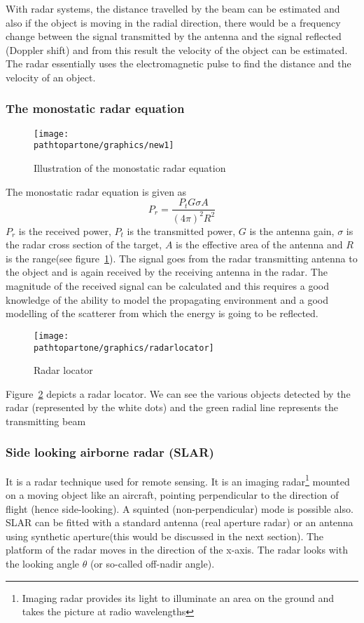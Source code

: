 With radar systems, the distance travelled by the beam can be estimated and also if the object is moving in the radial direction, there would be a frequency change between the signal transmitted by the antenna and the signal reflected (Doppler shift) and from this result the velocity of the object can be estimated. The radar essentially uses the electromagnetic pulse to find the distance and the velocity of an object.

\subsubsection{The monostatic radar equation}
\begin{figure}[h]
\centering
\texttt{[image: \\pathtopartone/graphics/new1]}
\label{fig:new1}
\caption{Illustration of the monostatic radar equation}
\end{figure}

The monostatic radar equation is given as
\begin{dmath*}
P_{r}= \frac{P_t G\sigma A}{(4\pi)^{2}R^{2}}
\end{dmath*}
$P_{r}$ is the received power, $P_t$ is the transmitted power, $G$ is the antenna gain, $\sigma$ is the radar cross section of the target, $A$ is the effective area of the antenna and $R$ is the range(see  figure~\ref{fig:new1}). The signal goes from the radar transmitting antenna to the object and is again received by the receiving antenna in the radar. The magnitude of the received signal can be calculated and this requires a good knowledge of the ability to model the propagating environment and a good modelling of the scatterer from which the energy is going to be reflected.

\begin{figure}[h]
\centering
\texttt{[image: \\pathtopartone/graphics/radarlocator]}
\caption{Radar locator}
\label{fig:radarlocator}
\end{figure}

Figure~\ref{fig:radarlocator} depicts a radar locator. We can see the various objects detected by the radar (represented by the white dots) and the green radial line represents the transmitting beam

\subsubsection{Side looking airborne radar (SLAR)} 
It is a radar technique used for remote sensing. It is an imaging radar\footnote{Imaging radar provides its light to illuminate an area on the ground and takes the picture at radio wavelengths} mounted on a moving object like an aircraft, pointing perpendicular to the direction of flight (hence side-looking). A squinted (non-perpendicular) mode is possible also. SLAR can be fitted with a standard antenna (real aperture radar) or an antenna using synthetic aperture(this would be discussed in the next section). The platform of the radar moves in the direction of the x-axis. The radar looks with the looking angle $\theta$ (or so-called off-nadir angle).

